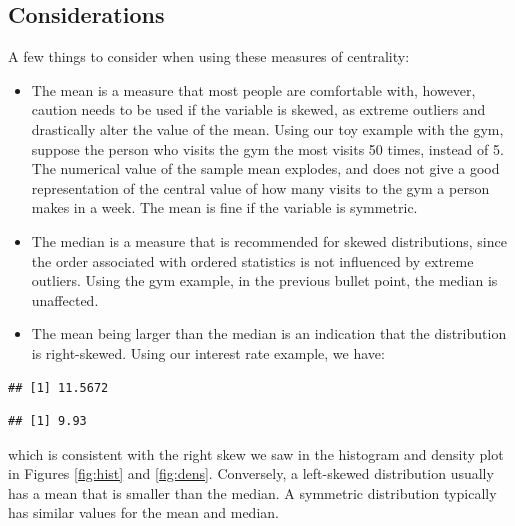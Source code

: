 \documentclass[
]{book}
\newenvironment{Shaded}{\begin{snugshade}}{\end{snugshade}}
\newcommand{\FunctionTok}[1]{\textcolor[rgb]{0.13,0.29,0.53}{\textbf{#1}}}
\newcommand{\NormalTok}[1]{#1}
\newcommand{\SpecialCharTok}[1]{\textcolor[rgb]{0.81,0.36,0.00}{\textbf{#1}}}
\begin{document}
\subsection{Considerations}\label{considerations}

A few things to consider when using these measures of centrality:

\begin{itemize}
\item
  The mean is a measure that most people are comfortable with, however, caution needs to be used if the variable is skewed, as extreme outliers and drastically alter the value of the mean. Using our toy example with the gym, suppose the person who visits the gym the most visits 50 times, instead of 5. The numerical value of the sample mean explodes, and does not give a good representation of the central value of how many visits to the gym a person makes in a week. The mean is fine if the variable is symmetric.
\item
  The median is a measure that is recommended for skewed distributions, since the order associated with ordered statistics is not influenced by extreme outliers. Using the gym example, in the previous bullet point, the median is unaffected.
\item
  The mean being larger than the median is an indication that the distribution is right-skewed. Using our interest rate example, we have:
\end{itemize}

\begin{Shaded}
\end{Shaded}

\begin{verbatim}
## [1] 11.5672
\end{verbatim}

\begin{Shaded}
\end{Shaded}

\begin{verbatim}
## [1] 9.93
\end{verbatim}

which is consistent with the right skew we saw in the histogram and density plot in Figures \ref{fig:hist} and \ref{fig:dens}. Conversely, a left-skewed distribution usually has a mean that is smaller than the median. A symmetric distribution typically has similar values for the mean and median.
\end{document}
